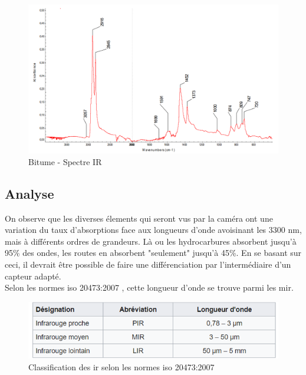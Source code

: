 \begin{figure}[H]
    \centering
    \includegraphics[width=13cm]{assets/figures/bitumeIR.png}
    \caption{Bitume - Spectre IR \cite{Bitume}}
\end{figure}

\subsection{Analyse}
On observe que les diverses élements qui seront vus par la caméra ont une variation du taux d'absorptions face aux longueurs d'onde avoisinant les
3300 \si{\nano\metre}, mais à différents ordres de grandeurs. Là ou les hydrocarbures absorbent jusqu'à 95\% des ondes, les routes en absorbent "seulement" jusqu'à 45\%.
En se basant sur ceci, il devrait être possible de faire une différenciation par l'intermédiaire d'un capteur adapté.\\
Selon les normes \Gls{iso} 20473:2007 \cite{ISO}, cette longueur d'onde se trouve parmi les \Gls{mir}.\\
\begin{figure}[H]
    \centering
    \includegraphics[width=13cm]{assets/figures/gamme_infra.png}
    \caption{Classification des \Gls{ir} selon les normes \Gls{iso} 20473:2007 \cite{ISO}}
\end{figure}
